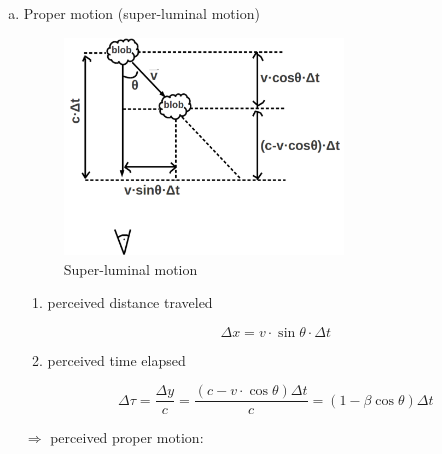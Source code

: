 \begin{enumerate}[a)]
   \item Proper motion  (super-luminal motion)
\begin{figure}[!htbp]
   \centering
   \includegraphics[width=0.7\textwidth]{HighEnergy/superluminal}
   \caption{Super-luminal motion}
\label{fig:superluminal}
\end{figure}

   \begin{enumerate}
      \item perceived distance traveled

\begin{equation}
   \Delta x = v\cdot \sin \theta \cdot \Delta t
\end{equation}
     
      \item perceived time elapsed

\begin{equation}
   \Delta \tau = \frac{\Delta y}{c}  = \frac{(c-v\cdot \cos \theta)\Delta t}{c} = \left( 1-\beta \cos \theta \right)\Delta t 
\end{equation}
   \end{enumerate}

$\Rightarrow$ perceived proper motion:


\end{enumerate}
